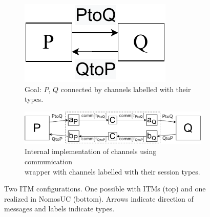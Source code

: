 \begin{figure}
	\begin{subfigure}{0.5\textwidth}
	\begin{center}
	\includegraphics[scale=0.5]{figures/p_and_q.pdf}
	\caption{Goal: $P$, $Q$ connected by channels labelled with their types.}
	\label{fig:pandq}
	\end{center}
	\vspace{0.1em}
	\end{subfigure}
	\begin{subfigure}{0.5\textwidth}
	\begin{center}
	\includegraphics[scale=0.4]{figures/newPandQ.pdf}
	\caption{Internal implementation of channels using communication\\wrapper
	with channels labelled with their session types.}
	\label{fig:newpandq}
	\end{center}
	\end{subfigure}
	\caption{Two ITM configurations. One possible with ITMs (top) and one realized in NomosUC (bottom). Arrows indicate direction of messages
	and labels indicate types.}
	\vspace{-1em}
\end{figure}

